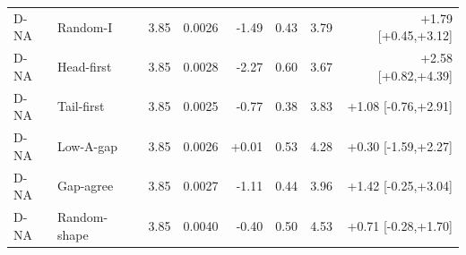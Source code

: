 \begin{table}[htbp]
\begin{tabular}{llrrrrrr}
D-NA & Random-I & 3.85 & 0.0026 & -1.49 & 0.43 & 3.79 & +1.79 [+0.45,+3.12]\\
D-NA & Head-first & 3.85 & 0.0028 & -2.27 & 0.60 & 3.67 & +2.58 [+0.82,+4.39]\\
D-NA & Tail-first & 3.85 & 0.0025 & -0.77 & 0.38 & 3.83 & +1.08 [-0.76,+2.91]\\
D-NA & Low-A-gap & 3.85 & 0.0026 & +0.01 & 0.53 & 4.28 & +0.30 [-1.59,+2.27]\\
D-NA & Gap-agree & 3.85 & 0.0027 & -1.11 & 0.44 & 3.96 & +1.42 [-0.25,+3.04]\\
D-NA & Random-shape & 3.85 & 0.0040 & -0.40 & 0.50 & 4.53 & +0.71 [-0.28,+1.70]\\
\bottomrule
\end{tabular}
\end{table}
